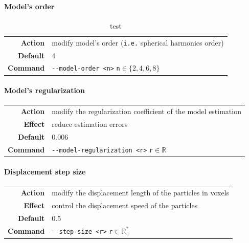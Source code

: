         \paragraph*{Model's order}
                \begin{table}
                    \centering
                    \caption{test}
                    \begin{tabular}{rl}
                        \textbf{Action}  & modify model's order (\texttt{i.e.} spherical harmonics order)\\
                        \textbf{Default} & 4\\
                        \textbf{Command} & \texttt{-\hspace{0.1mm}-model-order <n>} \hfill \texttt{n}$\in\{2,4,6,8\}$
                    \end{tabular}
                \end{table}

        \paragraph*{Model's regularization}
            \begin{center}
                \begin{tabular}{rl}
                    \textbf{Action}  & modify the regularization coefficient of the model estimation\\
                    \textbf{Effect}  & reduce estimation errors\\
                    \textbf{Default} & 0.006\\
                    \textbf{Command} & \texttt{-\hspace{0.1mm}-model-regularization <r>} \hfill \texttt{r}$\in\mathbb{R}$
                \end{tabular}
            \end{center}

        \paragraph*{Displacement step size}
            \begin{center}
                \begin{tabular}{rl}
                    \textbf{Action}  & modify the displacement length of the particles in voxels\\
                    \textbf{Effect}  & control the displacement speed of the particles\\
                    \textbf{Default} & 0.5\\
                    \textbf{Command} & \texttt{-\hspace{0.1mm}-step-size <r>} \hfill \texttt{r}$\in\mathbb{R}_+^*$
                \end{tabular}
            \end{center}

